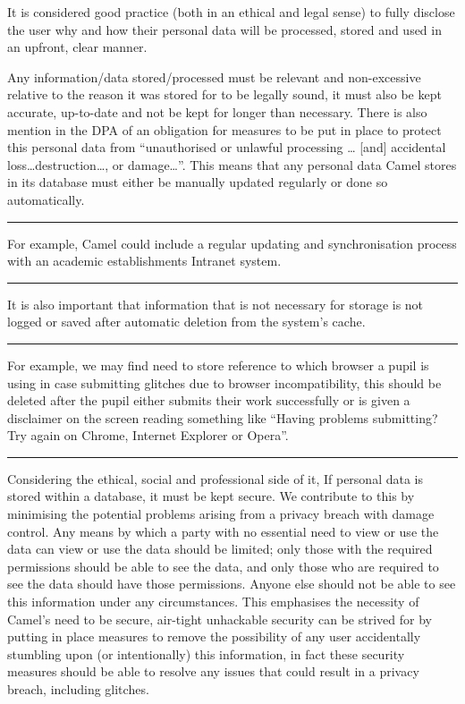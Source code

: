     It is considered good practice (both in an ethical and legal sense) to fully disclose the user why and how their personal data will be processed, stored and used in an upfront, clear manner. 

    Any information/data stored/processed must be relevant and non-excessive relative to the reason it was stored for to be legally sound, it must also be kept accurate, up-to-date and not be kept for longer than necessary. There is also mention in the DPA of an obligation for measures to be put in place to protect this personal data from “unauthorised or unlawful processing … [and] accidental loss\ldots destruction\ldots, or damage\ldots”.\cite{DPA:tDPP:S1} This means that any personal data Camel stores in its database must either be manually updated regularly or done so automatically.

    \vspace{0.2cm}
    \hrule
    \begin{flushright}
        \scriptsize For example, Camel could include a regular updating and synchronisation process with an academic establishments Intranet system.
    \end{flushright}
    \hrule
    \vspace{0.2cm}

    It is also important that information that is not necessary for storage is not logged or saved after automatic deletion from the system’s cache.

    \hrule
    \begin{flushright}
        \scriptsize  For example, we may find need to store reference to which browser a pupil is using in case submitting glitches due to  browser incompatibility, this should be deleted after the pupil either submits their work successfully or is given a disclaimer on the screen reading something like “Having problems submitting? Try again on Chrome, Internet Explorer or Opera”.
    \end{flushright}
    \hrule
    \vspace{0.2cm}

    Considering the ethical, social and professional side of it, If personal data is stored within a database, it must be kept secure. We contribute to this by minimising the potential problems arising from a privacy breach with damage control. Any means by which a party with no essential need to view or use the data can view or use the data should be limited; only those with the required permissions should be able to see the data, and only those who are required to see the data should have those permissions. Anyone else should not be able to see this information under any circumstances. This emphasises the necessity of Camel’s need to be secure, air-tight unhackable security can be strived for by putting in place measures to remove the possibility of any user accidentally stumbling upon (or intentionally) this information, in fact these security measures should be able to resolve any issues that could result in a privacy breach, including glitches.

